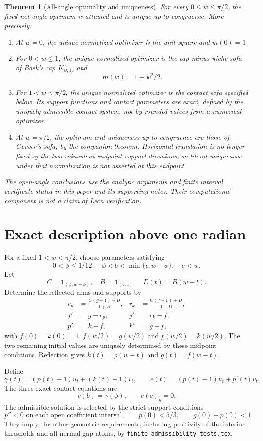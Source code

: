 \documentclass[11pt]{article}
\newtheorem{theorem}{Theorem}[section]
\theoremstyle{remark}\newtheorem{remark}[theorem]{Remark}
\begin{document}
\begin{theorem}[All-angle optimality and uniqueness]\label{thm:main}
For every $0\le w\le\pi/2$, the fixed-net-angle optimum is attained and is unique up to congruence. More precisely:
\begin{enumerate}
\item At $w=0$, the unique normalized optimizer is the unit square and $m(0)=1$.
\item For $0<w\le1$, the unique normalized optimizer is the cap-minus-niche sofa of Baek's cap $K_{w,1}$, and
\[
 m(w)=1+w^2/2.
\]
\item For $1<w<\pi/2$, the unique normalized optimizer is the contact sofa specified below. Its support functions and contact parameters are exact, defined by the uniquely admissible contact system, not by rounded values from a numerical optimizer.
\item At $w=\pi/2$, the optimum and uniqueness up to congruence are those of Gerver's sofa, by the companion theorem. Horizontal translation is no longer fixed by the two coincident endpoint support directions, so literal uniqueness under that normalization is not asserted at this endpoint.
\end{enumerate}
The open-angle conclusions use the analytic arguments and finite interval certificate stated in this paper and its supporting notes. Their computational component is not a claim of Lean verification.
\end{theorem}

\section{Exact description above one radian}
For a fixed $1<w<\pi/2$, choose parameters satisfying
\[
 0<\phi\le1/12,\quad \phi<b<\min\{c,w-\phi\},\quad c<w.
\]
Let
\[
 C=\mathbf1_{(\phi,w-\phi)},\quad B=\mathbf1_{(b,c)},\quad D(t)=B(w-t).
\]
Determine the reflected arms and supports by
\begin{align*}
 r_p&=\frac{C(g-1)+B}{1+B},&r_k&=\frac{C(f-1)+D}{1+D},\\
 f'&=g-r_p,&g'&=r_k-f,\\
 p'&=k-f,&k'&=g-p,
\end{align*}
with $f(0)=k(0)=1$, $f(w/2)=g(w/2)$ and $p(w/2)=k(w/2)$. The two remaining initial values are uniquely determined by these midpoint conditions. Reflection gives $k(t)=p(w-t)$ and $g(t)=f(w-t)$.

Define
\[
 \gamma(t)=(p(t)-1)u_t+(k(t)-1)v_t,\qquad
 e(t)=(p(t)-1)u_t+p'(t)v_t.
\]
The three exact contact equations are
\begin{equation}\label{eq:contacts}
 e(b)=\gamma(\phi),\qquad e(c)_y=0.
\end{equation}
The admissible solution is selected by the strict support conditions
\begin{equation}\label{eq:admissible}
 p''<0\text{ on each open coefficient interval},\qquad
 p(0)<5/3,\qquad g(0)-p(0)<1.
\end{equation}
They imply the other geometric requirements, including positivity of the interior thresholds and all normal-gap atoms, by \texttt{finite-admissibility-tests.tex}.
\end{document}
